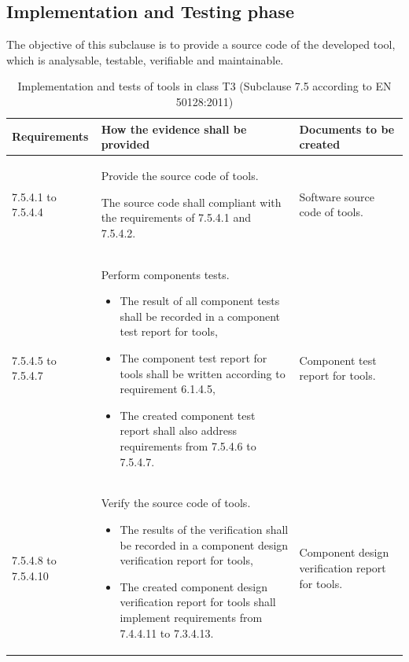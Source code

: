 \documentclass{template/openetcs_report}
\begin{document}
\subsection{Implementation and Testing phase}
\begin{flushleft}
The objective of this subclause is to provide a source code of the developed tool, which is analysable, testable, verifiable and maintainable.
\end{flushleft}
{\footnotesize\sffamily\centering
\begin{longtable}{|p{2cm}|p{9cm}|p{3cm}|}
\caption{Implementation and tests of tools in class T3 (Subclause 7.5 according to EN 50128:2011)}\\
\hline
\bfseries Requirements & \bfseries How the evidence shall be provided & \bfseries Documents to be created\\
\hline
\hline
\endhead
\hline
\endfoot

7.5.4.1 to 7.5.4.4 & Provide the source code of tools.

The source code shall compliant with the requirements of 7.5.4.1 and 7.5.4.2.
& Software source code of tools.\\ 
\hline
7.5.4.5 to 7.5.4.7 & Perform components tests.

\begin{itemize}\itemsep=0pt
  \item The result of all component tests shall be recorded in a component test report for tools,
  \item The component test report for tools shall be written according to requirement 6.1.4.5,
  \item The created component test report shall also address requirements from 7.5.4.6 to 7.5.4.7.
\end{itemize}
& Component test report for tools.\\ 
\hline
7.5.4.8 to 7.5.4.10 & Verify the source code of tools.

\begin{itemize}\itemsep=0pt
  \item The results of the verification shall be recorded in a component design verification report for tools,
  \item The created component design verification report for tools shall implement requirements from 7.4.4.11 to 7.3.4.13.
\end{itemize}
& Component design verification report for tools.\\ 
\hline
\end{longtable}}
\end{document}
